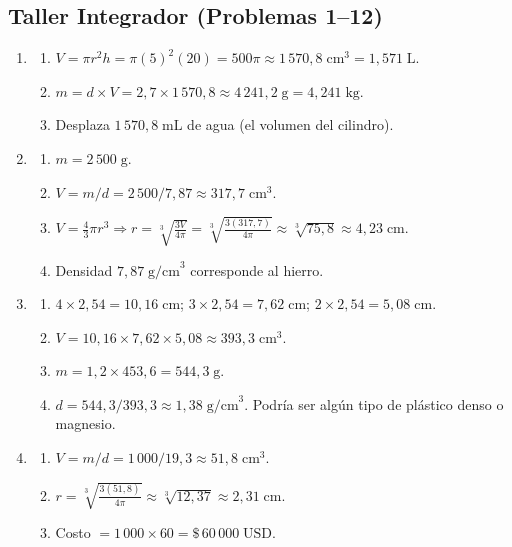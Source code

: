 \documentclass[12pt, letterpaper]{article}
\begin{document}
\subsection*{Taller Integrador (Problemas 1--12)}

\begin{enumerate}[leftmargin=*, label=\textbf{\arabic*.}]
  \item \begin{enumerate}[label=\alph*)]
    \item $V = \pi r^2 h = \pi(5)^2(20) = 500\pi \approx 1\,570{,}8\;\text{cm}^3 = 1{,}571\;\text{L}$.
    \item $m = d \times V = 2{,}7 \times 1\,570{,}8 \approx 4\,241{,}2\;\text{g} = 4{,}241\;\text{kg}$.
    \item Desplaza $1\,570{,}8\;\text{mL}$ de agua (el volumen del cilindro).
  \end{enumerate}

  \item \begin{enumerate}[label=\alph*)]
    \item $m = 2\,500\;\text{g}$.
    \item $V = m/d = 2\,500/7{,}87 \approx 317{,}7\;\text{cm}^3$.
    \item $V = \frac{4}{3}\pi r^3 \Rightarrow r = \sqrt[3]{\frac{3V}{4\pi}} = \sqrt[3]{\frac{3(317{,}7)}{4\pi}} \approx \sqrt[3]{75{,}8} \approx 4{,}23\;\text{cm}$.
    \item Densidad $7{,}87\;\text{g/cm}^3$ corresponde al hierro.
  \end{enumerate}

  \item \begin{enumerate}[label=\alph*)]
    \item $4 \times 2{,}54 = 10{,}16\;\text{cm}$; $3 \times 2{,}54 = 7{,}62\;\text{cm}$; $2 \times 2{,}54 = 5{,}08\;\text{cm}$.
    \item $V = 10{,}16 \times 7{,}62 \times 5{,}08 \approx 393{,}3\;\text{cm}^3$.
    \item $m = 1{,}2 \times 453{,}6 = 544{,}3\;\text{g}$.
    \item $d = 544{,}3 / 393{,}3 \approx 1{,}38\;\text{g/cm}^3$. Podría ser algún tipo de plástico denso o magnesio.
  \end{enumerate}

  \item \begin{enumerate}[label=\alph*)]
    \item $V = m/d = 1\,000/19{,}3 \approx 51{,}8\;\text{cm}^3$.
    \item $r = \sqrt[3]{\frac{3(51{,}8)}{4\pi}} \approx \sqrt[3]{12{,}37} \approx 2{,}31\;\text{cm}$.
    \item Costo $= 1\,000 \times 60 = \$\,60\,000\;\text{USD}$.
  \end{enumerate}


\end{enumerate}
\end{document}
